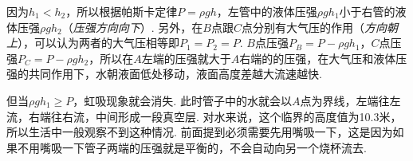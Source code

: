 \begin{multicols}{2}
    因为$h_1 < h_2$，所以根据帕斯卡定律$P=\rho gh$，左管中的液体压强$\rho gh_1$小于右管的液体压强$\rho gh_2$（\textit{压强方向向下}）. 另外，在$B$点跟$C$点分别有大气压的作用（\textit{方向朝上}），可以认为两者的大气压相等即$P_1 = P_2 = P$. $B$点压强$P_B = P - \rho gh_1$，$C$点压强$P_C = P - \rho gh_2$，所以在$A$左端的压强就大于$A$右端的的压强，在大气压和液体压强的共同作用下，水朝液面低处移动，液面高度差越大流速越快. 
    
    但当$\rho gh_1\ge P$，虹吸现象就会消失. 此时管子中的水就会以$A$点为界线，左端往左流，右端往右流，中间形成一段真空层. 对水来说，这个临界的高度值为10.3米，所以生活中一般观察不到这种情况. 前面提到必须需要先用嘴吸一下，这是因为如果不用嘴吸一下管子两端的压强就是平衡的，不会自动向另一个烧杯流去. 

\end{multicols}



